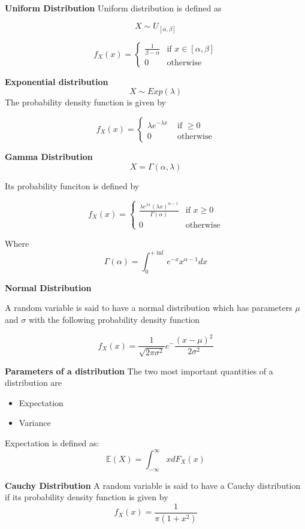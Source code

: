 \textbf{Uniform Distribution}
Uniform distribution is defined as

$$X \sim U_{[\alpha, \beta]}$$

$$f_X(x) = \begin{cases} \frac{1}{\beta - \alpha} & \text{if } x \in [\alpha, \beta] \\ 0 & \text{otherwise} \end{cases}$$

\textbf{Exponential distribution}\\
$$X \sim Exp(\lambda)$$
The probability density function is given by

$$ f_X(x) = \begin{cases} \lambda e^{-\lambda x} &  \text{ if }\geq 0 \\ 0 & \text{ otherwise} \end{cases}$$

\textbf{Gamma Distribution}\\
$$X = \Gamma(\alpha, \lambda)$$

Its probability funciton is defined by

$$f_X(x) = \begin{cases} \frac{\lambda e^{\lambda x} (\lambda x)^{\alpha-1}}{\Gamma(\alpha)} & \text{if } x \geq 0 \\ 0 & \text{otherwise} \end{cases}$$

Where
$$\Gamma(\alpha) = \int_0^{+\inf} e^{-x} x^{\alpha-1} dx$$

\textbf{Normal Distribution}

A random variable is said to have a normal distribution which has parameters $\mu$ and $\sigma$ with the following probability density function

$$f_X(x) = \frac{1}{\sqrt{2 \pi \sigma^2}}e^-\frac{(x - \mu)^2}{2\sigma^2}$$

\textbf{Parameters of a distribution}
The two most important quantities of a distribution are
\begin{itemize}
\item Expectation
\item Variance
\end{itemize}

Expectation is defined as:
$$\mathbb{E}(X) = \int_{-\infty}^\infty x dF_X(x)$$

\textbf{Cauchy Distribution}
A random variable is said to have a Cauchy distribution if its probability density function is given by
$$f_X(x) = \frac{1}{\pi(1+x^2)}$$

